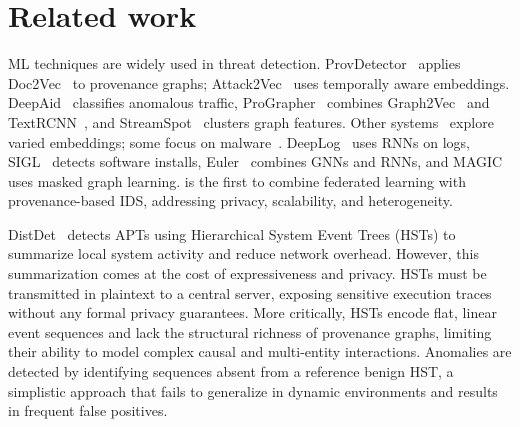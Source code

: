 \section{Related work}
\label{s:relwk}






 ML techniques are widely used in threat detection. ProvDetector~\cite{provdetector2020} applies Doc2Vec~\cite{le2014distributed} to provenance graphs; Attack2Vec~\cite{shen2019attack2vec} uses temporally aware embeddings. DeepAid~\cite{deepaid} classifies anomalous traffic, ProGrapher~\cite{yangprographer} combines Graph2Vec~\cite{narayanan2017graph2vec} and TextRCNN~\cite{lai2015recurrent}, and StreamSpot~\cite{streamspot} clusters graph features. Other systems~\cite{aljawarneh2018anomaly, maseer2021benchmarking, gyanchandani2012taxonomy, atlas} explore varied embeddings; some focus on malware~\cite{zolkipli2011approach, chakkaravarthy2019survey, isohara2011kernel}. DeepLog~\cite{deeplog2017} uses RNNs on logs, SIGL~\cite{sigl} detects software installs, Euler~\cite{king2022euler} combines GNNs and RNNs, and MAGIC~\cite{jia2023magic} uses masked graph learning. \Sys is the first to combine federated learning with provenance-based IDS, addressing privacy, scalability, and heterogeneity.

DistDet~\cite{dong2023distdet} detects APTs using Hierarchical System Event Trees (HSTs) to summarize local system activity and reduce network overhead. However, this summarization comes at the cost of expressiveness and privacy. HSTs must be transmitted in plaintext to a central server, exposing sensitive execution traces without any formal privacy guarantees. More critically, HSTs encode flat, linear event sequences and lack the structural richness of provenance graphs, limiting their ability to model complex causal and multi-entity interactions. Anomalies are detected by identifying sequences absent from a reference benign HST, a simplistic approach that fails to generalize in dynamic environments and results in frequent false positives.



